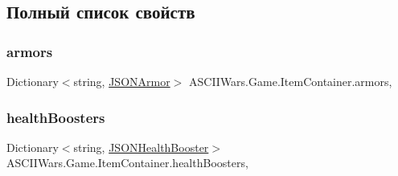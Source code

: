 \subsection{Полный список свойств}
\hypertarget{class_a_s_c_i_i_wars_1_1_game_1_1_item_container_ac7163583c5b161a5621b1d8c8eecb628}{}\label{class_a_s_c_i_i_wars_1_1_game_1_1_item_container_ac7163583c5b161a5621b1d8c8eecb628} 
\subsubsection{\texorpdfstring{armors}{armors}}
{\footnotesize\ttfamily Dictionary$<$string, \hyperlink{class_a_s_c_i_i_wars_1_1_game_1_1_j_s_o_n_armor}{J\+S\+O\+N\+Armor}$>$ A\+S\+C\+I\+I\+Wars.\+Game.\+Item\+Container.\+armors\hspace{0.3cm}{\ttfamily [get]}, {\ttfamily [set]}}

\hypertarget{class_a_s_c_i_i_wars_1_1_game_1_1_item_container_aaecb48567ec96981ee40734e45f3339b}{}\label{class_a_s_c_i_i_wars_1_1_game_1_1_item_container_aaecb48567ec96981ee40734e45f3339b} 
\subsubsection{\texorpdfstring{health\+Boosters}{healthBoosters}}
{\footnotesize\ttfamily Dictionary$<$string, \hyperlink{class_a_s_c_i_i_wars_1_1_game_1_1_j_s_o_n_health_booster}{J\+S\+O\+N\+Health\+Booster}$>$ A\+S\+C\+I\+I\+Wars.\+Game.\+Item\+Container.\+health\+Boosters\hspace{0.3cm}{\ttfamily [get]}, {\ttfamily [set]}}

\hypertarget{class_a_s_c_i_i_wars_1_1_game_1_1_item_container_a84c795ebe8785d1d14dad75b7670f68a}{}\label{class_a_s_c_i_i_wars_1_1_game_1_1_item_container_a84c795ebe8785d1d14dad75b7670f68a} 
